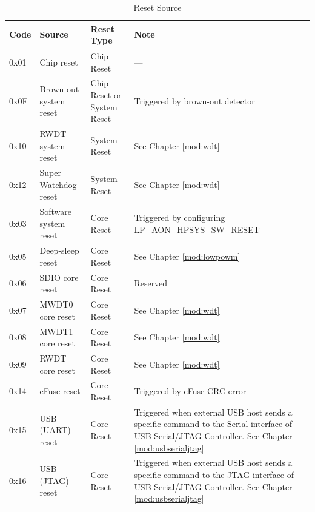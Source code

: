 \documentclass[main\_\_EN.tex]{subfiles}
\begin{document}
\begin{table}[H]
    \centering
    \caption{Reset Source}
    \label{tab:resclk-reset-src}
    \begin{threeparttable}
    \begin{tabular}{ |l|m{3.5cm}|m{1.8cm}|m{9.2cm}| }
    \hline
\rowcolor{lightgray}
\textbf{Code} & \textbf{Source} & \textbf{Reset Type} &   \textbf{Note} \\\hline
        0x01 & Chip reset\tnote{1} & Chip Reset &---\\
        \hline
        0x0F & Brown-out system reset & Chip Reset or System Reset & Triggered by brown-out detector\tnote{2}\\
        \hline
        0x10 & RWDT system reset & System Reset & See Chapter \ref{mod:wdt} \textit{\nameref{mod:wdt}}
        \\\hline
        0x12 & Super Watchdog reset & System Reset & See Chapter \ref{mod:wdt} \textit{\nameref{mod:wdt}}
        \\\hline
        0x03 & Software system reset & Core Reset & Triggered by configuring \hyperref[fielddesc:LPAONHPSYSSWRESET]{LP\_AON\_HPSYS\_SW\_RESET}\\
        \hline
        0x05 & Deep-sleep reset & Core Reset & See Chapter \ref{mod:lowpowm} \textit{\nameref{mod:lowpowm}}
        \\\hline
        0x06 & SDIO core reset & Core Reset & Reserved
        \\\hline
        0x07 & MWDT0 core reset & Core Reset & See Chapter \ref{mod:wdt} \textit{\nameref{mod:wdt}}
        \\\hline
        0x08 & MWDT1 core reset & Core Reset & See Chapter \ref{mod:wdt} \textit{\nameref{mod:wdt}}
        \\\hline
        0x09 & RWDT core reset & Core Reset & See Chapter \ref{mod:wdt} \textit{\nameref{mod:wdt}}
        \\\hline
        0x14 & eFuse reset & Core Reset & Triggered by eFuse CRC error
        \\\hline
        0x15 & USB (UART) reset & Core Reset & Triggered when external USB host sends a specific command to the Serial interface of USB Serial/JTAG Controller. See Chapter \ref{mod:usbserialjtag} \textit{\nameref{mod:usbserialjtag}} \\\hline
        0x16 & USB (JTAG) reset & Core Reset & Triggered when external USB host sends a specific command to the JTAG interface of USB Serial/JTAG Controller. See Chapter \ref{mod:usbserialjtag} \textit{\nameref{mod:usbserialjtag}} \\\hline

\end{tabular}
\end{threeparttable}
\end{table}
\end{document}
